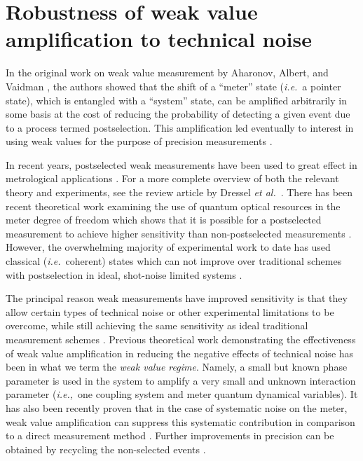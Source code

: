 \chapter[Weak values under noise]{Robustness of weak value amplification to technical noise}\label{ch:iwv}
In the original work on weak value measurement by Aharonov, Albert, and Vaidman \cite{Aharonov1988}, the authors showed that the shift of a ``meter'' state (\emph{i.e.}~a pointer state), which is entangled with a ``system'' state, can be amplified arbitrarily in some basis at the cost of reducing the probability of detecting a given event due to a process termed postselection.  This amplification led eventually to interest in using weak values for the purpose of precision measurements \cite{Hosten2008,Dixon2009}. 
 
In recent years, postselected weak measurements have been used to great effect in metrological applications \cite{Dixon2009,Starling2009,Starling2010,Starling2010a,Howell2010,Hogan2011,Pfeifer2011,Egan2012,Gorodetski2012,Zhou2012,Strubi2013,Viza2013,Xu2013,Zhou2013,Loaiza2014,Salazar2014,Salazar2015}.  For a more complete overview of both the relevant theory and experiments, see the review article by Dressel \emph{et al.}~\cite{Dressel2014}.  There has been recent theoretical work 
examining the use of quantum optical resources in the meter degree of freedom which shows that it is possible for a postselected measurement to achieve higher sensitivity than non-postselected measurements \cite{Pang2014,Pang2015}.  However, the overwhelming majority of experimental work to date has used classical (\emph{i.e.}~coherent) states which can not improve over traditional schemes with postselection in ideal, shot-noise limited systems \cite{Pang2015}.

The principal reason weak measurements have improved sensitivity is that they allow certain types of technical  noise or other experimental limitations to be overcome, while still achieving the same sensitivity as ideal traditional measurement schemes \cite{Starling2009,Jordan2014,Knee2014,Viza2015,Alves2015,Torres2016,Harris2016}.  Previous theoretical work demonstrating the effectiveness of weak value amplification in reducing the negative effects of technical noise has been in what we term the \emph{weak value regime}.  Namely, a small but known phase parameter is used in the system to amplify a very small and unknown interaction parameter (\emph{i.e.,}~one coupling system and meter quantum dynamical variables).  It has also been recently proven that in the case of systematic noise on the meter, weak value amplification can suppress this systematic contribution in comparison to a direct measurement method \cite{Pang2016}.  Further improvements in precision can be obtained by recycling the non-selected events \cite{Dressel2013,Lyons2015,Byard2015,Wang2016}.

